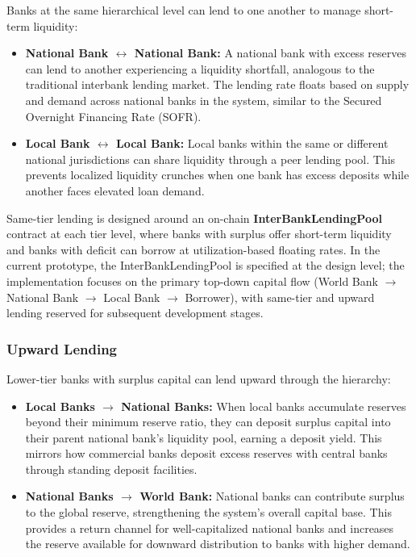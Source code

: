 \documentclass[12pt,a4paper]{report}
\begin{document}
Banks at the same hierarchical level can lend to one another to manage short-term liquidity:

\begin{itemize}[noitemsep]
\item \textbf{National Bank $\leftrightarrow$ National Bank:} A national bank with excess reserves can lend to another experiencing a liquidity shortfall, analogous to the traditional interbank lending market. The lending rate floats based on supply and demand across national banks in the system, similar to the Secured Overnight Financing Rate (SOFR).
\item \textbf{Local Bank $\leftrightarrow$ Local Bank:} Local banks within the same or different national jurisdictions can share liquidity through a peer lending pool. This prevents localized liquidity crunches when one bank has excess deposits while another faces elevated loan demand.
\end{itemize}

Same-tier lending is designed around an on-chain \textbf{InterBankLendingPool} contract at each tier level, where banks with surplus offer short-term liquidity and banks with deficit can borrow at utilization-based floating rates. In the current prototype, the InterBankLendingPool is specified at the design level; the implementation focuses on the primary top-down capital flow (World Bank $\to$ National Bank $\to$ Local Bank $\to$ Borrower), with same-tier and upward lending reserved for subsequent development stages.

\subsubsection{Upward Lending}

Lower-tier banks with surplus capital can lend upward through the hierarchy:

\begin{itemize}[noitemsep]
\item \textbf{Local Banks $\to$ National Banks:} When local banks accumulate reserves beyond their minimum reserve ratio, they can deposit surplus capital into their parent national bank's liquidity pool, earning a deposit yield. This mirrors how commercial banks deposit excess reserves with central banks through standing deposit facilities.
\item \textbf{National Banks $\to$ World Bank:} National banks can contribute surplus to the global reserve, strengthening the system's overall capital base. This provides a return channel for well-capitalized national banks and increases the reserve available for downward distribution to banks with higher demand.
\end{itemize}
\end{document}
